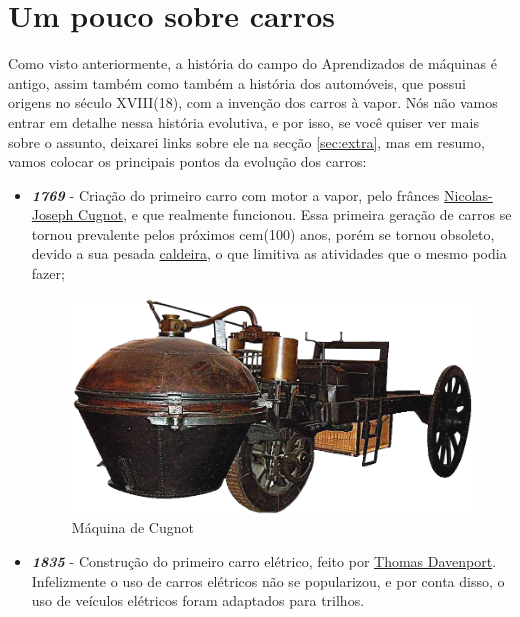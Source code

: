 \documentclass[12pt]{article}
\begin{document}
    \section {Um pouco sobre carros} \label{sec:carros}

        Como visto anteriormente, a história do campo do Aprendizados de máquinas é antigo, assim também como também a história 
        dos automóveis, que possui origens no século XVIII(18), com a invenção dos carros à vapor. Nós não vamos entrar em 
        detalhe nessa história evolutiva, e por isso, se você quiser ver mais sobre o assunto, deixarei links sobre ele na secção \ref{sec:extra}, 
        mas em resumo, vamos colocar os principais pontos da evolução dos carros:

        \begin{itemize}

            \item \textbf{\emph{1769}} - Criação do primeiro carro com motor a vapor, pelo frânces \href{https://pt.wikipedia.org/wiki/Joseph_Cugnot}{Nicolas-Joseph Cugnot},
            e que realmente funcionou. Essa primeira geração de carros se tornou prevalente pelos próximos cem(100) anos, porém se tornou obsoleto, devido a sua pesada 
            \href{https://www.rwengenharia.eng.br/o-que-e-uma-caldeira/}{caldeira}, o que limitiva as atividades que o mesmo podia fazer;

            \begin{figure}[htp]

                \centering
                \includegraphics[scale=0.5]{vapor.png}
                \caption{\centering Máquina de Cugnot}

            \end{figure}

            \item \textbf{\emph{1835}} - Construção do primeiro carro elétrico, feito por \href{https://en.wikipedia.org/wiki/Thomas_Davenport_(inventor)}{Thomas Davenport}. 
            Infelizmente o uso de carros elétricos não se popularizou, e por conta disso, o uso de veículos elétricos foram adaptados para trilhos.


\end{itemize}
\end{document}
